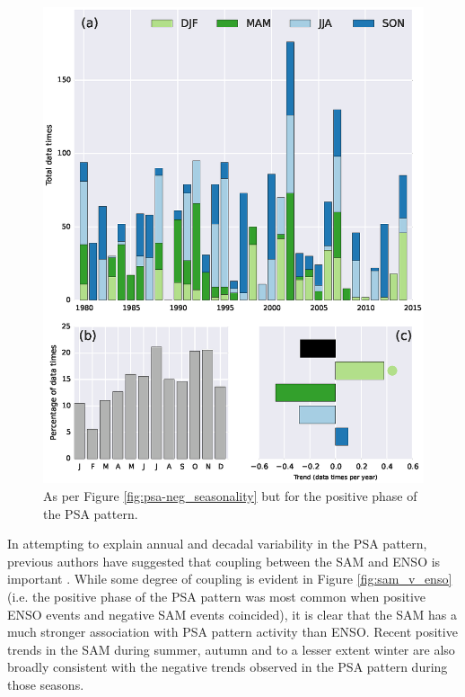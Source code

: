 \begin{figure}
\begin{center}
\includegraphics[width=0.9\columnwidth]{figures/psa/Figure4-8.eps}
\caption[Variability and trends in the positive phase of the PSA pattern]{\label{fig:psa-pos_seasonality}
As per Figure \ref{fig:psa-neg_seasonality} but for the positive phase of the PSA pattern.%
}
\end{center}
\end{figure}


In attempting to explain annual and decadal variability in the PSA pattern, previous authors have suggested that coupling between the SAM and ENSO is important \citep[e.g.][]{Fogt2006}. While some degree of coupling is evident in Figure \ref{fig:sam_v_enso} (i.e. the positive phase of the PSA pattern was most common when positive ENSO events and negative SAM events coincided), it is clear that the SAM has a much stronger association with PSA pattern activity than ENSO. Recent positive trends in the SAM during summer, autumn and to a lesser extent winter \citep[the latter being smaller and not statistically significant; e.g.][]{Simmonds2015} are also broadly consistent with the negative trends observed in the PSA pattern during those seasons.  


